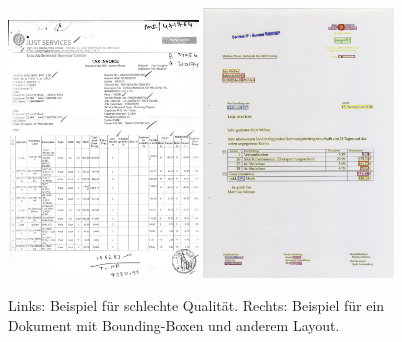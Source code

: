 \begin{figure}[h!]
    \centering
    \includegraphics[width=0.45\textwidth]{graphics/bad_qual.png}
    \hfill %
    \hfill %
    \includegraphics[width=0.45\textwidth]{graphics/doc_with_boc.png}
    \caption{Links: Beispiel für schlechte Qualität. Rechts: Beispiel für ein Dokument mit Bounding-Boxen und anderem Layout.}
    \label{fig:three_images}
  \end{figure}

